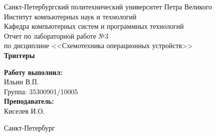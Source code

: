 \begin{titlepage}
    \begin{center}
        \large Санкт-Петербургский политехнический университет Петра Великого\\
        \large Институт компьютерных наук и технологий \\
        \large Кафедра компьютерных систем и программных технологий\\[6cm]


        \huge Отчет по лабораторной работе №3\\[0.5cm]
        \large по дисциплине <<Схемотехника операционных устройств>>\\[0.1cm]
        \large\textbf{Триггеры}\\[5cm]
    \end{center}


    \begin{flushright}
        \begin{minipage}{0.25\textwidth}
            \begin{flushleft}

                \large\textbf{Работу выполнил:}\\
                \large Ильин В.П.\\
                \large {Группа:} 35300901/10005\\

                \large \textbf{Преподаватель:}\\
                \large Киселев И.О.

            \end{flushleft}
        \end{minipage}
    \end{flushright}

    \vfill

    \begin{center}
        \large Санкт-Петербург\\
        \large \the\year
    \end{center}
\end{titlepage}

\vfill
\newpage